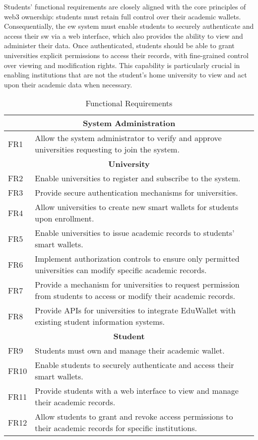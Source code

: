Students' functional requirements are closely aligned with the core principles of \Gls{web3} ownership: students must retain full control over their academic wallets. Consequentially, the \acrshort{ew} system must enable students to securely authenticate and access their \acrshort{sw} via a web interface, which also provides the ability to view and administer their data. Once authenticated, students should be able to grant universities explicit permissions to access their records, with fine-grained control over viewing and modification rights. This capability is particularly crucial in enabling institutions that are not the student's home university to view and act upon their academic data when necessary.

\begin{table}
\centering
\caption{Functional Requirements}
\label{tab:funcReq}
\begin{tabular}{|p{1.0cm}|p{11cm}|}
\hline
\multicolumn{2}{|c|}{\textbf{System Administration}} \\
\hline
FR1 & Allow the system administrator to verify and approve universities requesting to join the system. \\
\hline
\multicolumn{2}{|c|}{\textbf{University}} \\
\hline
FR2 & Enable universities to register and subscribe to the system. \\
FR3 & Provide secure authentication mechanisms for universities. \\
FR4 & Allow universities to create new smart wallets for students upon enrollment. \\
FR5 & Enable universities to issue academic records to students' smart wallets. \\
FR6 & Implement authorization controls to ensure only permitted universities can modify specific academic records. \\
FR7 & Provide a mechanism for universities to request permission from students to access or modify their academic records. \\
FR8 & Provide APIs for universities to integrate EduWallet with existing student information systems. \\
\hline
\multicolumn{2}{|c|}{\textbf{Student}} \\
\hline
FR9  & Students must own and manage their academic wallet. \\
FR10 & Enable students to securely authenticate and access their smart wallets. \\
FR11 & Provide students with a web interface to view and manage their academic records. \\
FR12 & Allow students to grant and revoke access permissions to their academic records for specific institutions. \\
\hline
\end{tabular}
\end{table}

